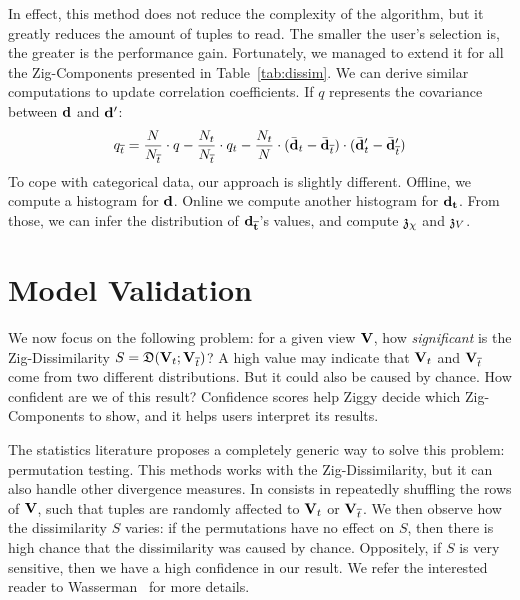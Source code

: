 In effect, this method does not reduce the complexity of the algorithm, but it
greatly reduces the amount of tuples to read. The smaller the user's selection
is, the greater is the performance gain. Fortunately, we managed to extend it
for all the Zig-Components presented in Table~\ref{tab:dissim}.  We can derive
similar computations to update correlation
coefficients. If $q$ represents the covariance between $\bf{d}$ and $\bf{d}'$:
\begin{equation}
    q_{\overline{t}} = \frac{N}{N_{\overline{t}}} \cdot q - \frac{N_t}{N_{\overline{t}}} \cdot q_t -
        \frac{N_t}{N} \cdot (\bar{\bf{d}}_t -  \bar{\bf{d}}_{\overline{t}}) \cdot
                             (\bar{\bf{d}}'_t -  \bar{\bf{d}}'_{\overline{t}}) 
\end{equation}
To cope with categorical data, our approach is slightly different. Offline, we
compute a histogram for $\bf{d}$.  Online we compute another histogram for
$\bf{d}_t$. From those, we can infer the distribution of $\bf{d}_{\overline{t}}$'s
values, and compute $\mathfrak{z}_\chi$ and $\mathfrak{z}_V$.

\section{Model Validation}
\label{sec:validation}
We now focus on the following problem: for a given view $\mathbf{V}$, how
\emph{significant} is the Zig-Dissimilarity $S = \mathfrak{D}( \mathbf{V}_t  ;
\mathbf{V}_{\overline{t}})$? A high value may indicate that $\mathbf{V}_t$ and
$\mathbf{V}_{\overline{t}}$ come from two different distributions.  But it could
also be caused by chance. How confident are we of this result? Confidence
scores help Ziggy decide which Zig-Components to show, and it helps users
interpret its results.

The statistics literature proposes a completely ge\-ne\-ric way to solve this
problem: permutation testing. This methods works with the Zig-Dissimilarity, but
it can also handle other divergence measures. In consists in repeatedly
shuffling the rows of $\mathbf{V}$, such that tuples are randomly affected to $\mathbf{V}_t$
or $\mathbf{V}_{\overline{t}}$. We then observe how the dissimilarity $S$ varies:
if the permutations have no effect on $S$, then there is high chance that the
dissimilarity was caused by chance.  Oppositely, if $S$ is very sensitive, then
we have a high confidence in our result. We refer the interested reader to
Wasserman~\cite{wasserman2013all} for more details.

